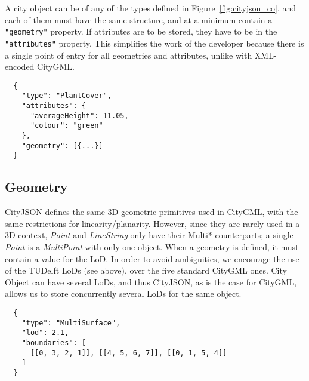 %

A city object can be of any of the types defined in Figure~\ref{fig:cityjson_co}, and each of them must have the same structure, and at a minimum contain a \texttt{"geometry"} property. 
If attributes are to be stored, they have to be in the \texttt{"attributes"} property.
This simplifies the work of the developer because there is a single point of entry for all geometries and attributes, unlike with XML-encoded CityGML\@.
\begin{lstlisting}
  {
    "type": "PlantCover",
    "attributes": {
      "averageHeight": 11.05,
      "colour": "green"
    },
    "geometry": [{...}]
  }
\end{lstlisting}


\subsection{Geometry}

CityJSON defines the same 3D geometric primitives used in CityGML, with the same restrictions for linearity/planarity.
However, since they are rarely used in a 3D context, \emph{Point} and \emph{LineString} only have their Multi* counterparts; a single \emph{Point} is a \emph{MultiPoint} with only one object.
When a geometry is defined, it must contain a value for the LoD. 
In order to avoid ambiguities, we encourage the use of the TUDelft LoDs (see above), over the five standard CityGML ones.
City Object can have several LoDs, and thus CityJSON, as is the case for CityGML, allows us to store concurrently several LoDs for the same object.
\begin{lstlisting}
  {
    "type": "MultiSurface",
    "lod": 2.1,
    "boundaries": [
      [[0, 3, 2, 1]], [[4, 5, 6, 7]], [[0, 1, 5, 4]]
    ]
  }
\end{lstlisting}

